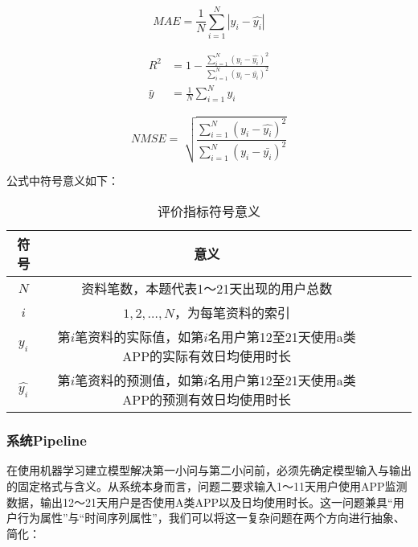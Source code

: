 \documentclass[withoutpreface,bwprint]{cumcmthesis}
\begin{document}
\begin{equation}
    MAE = \frac{1}{N} \sum_{i=1}^{N} |y_i-\hat{y_i}|
    \label{eq:mae}
\end{equation}

\begin{align}
    R^2     & = 1- \frac{
        \sum_{i=1}^{N} (y_i-\hat{y_i})^2}{
    \sum_{i=1}^{N} (y_i-\bar{y_i})^2}         \\
    \bar{y} & =\frac{1}{N} \sum_{i=1}^{N} y_i
    \label{eq:r2}
\end{align}

\begin{equation}
    NMSE = \sqrt[]{\frac{
            \sum_{i=1}^{N} (y_i-\hat{y_i})^2}{
            \sum_{i=1}^{N} (y_i-\bar{y_i})^2}}
    \label{eq:nmse}
\end{equation}

公式中符号意义如下：

\begin{table}[!htbp]
    \caption{评价指标符号意义}\label{tab:equation} \centering
    \begin{tabular}{ccccc}
        \toprule[1.5pt]
        符号          & 意义                                            \\
        \midrule[1pt]
        $N$         & 资料笔数，本题代表1～21天出现的用户总数                         \\
        $i$         & $1, 2,\ldots, N$，为每笔资料的索引                     \\
        $y_i$       & 第$i$笔资料的实际值，如第$i$名用户第12至21天使用a类APP的实际有效日均使用时长 \\
        $\hat{y_i}$ & 第$i$笔资料的预测值，如第$i$名用户第12至21天使用a类APP的预测有效日均使用时长 \\
        \bottomrule[1.5pt]
    \end{tabular}
\end{table}

\subsubsection{系统Pipeline}

在使用机器学习建立模型解决第一小问与第二小问前，必须先确定模型输入与输出的固定格式与含义。从系统本身而言，问题二要求输入1～11天用户使用APP监测数据，输出12～21天用户是否使用A类APP以及日均使用时长。这一问题兼具“用户行为属性”与“时间序列属性”，我们可以将这一复杂问题在两个方向进行抽象、简化：
\end{document}
